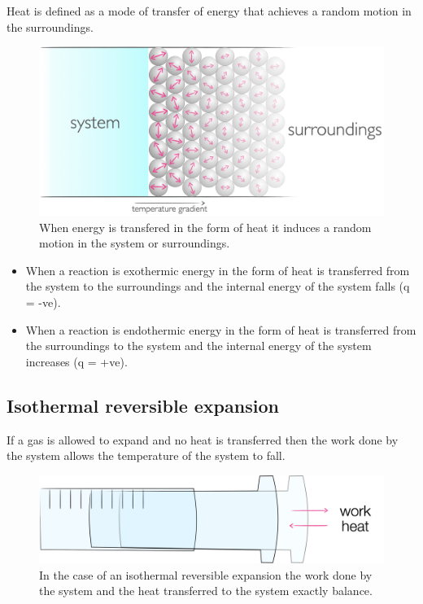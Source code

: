 \documentclass[
]{book}
\begin{document}
Heat is defined as a mode of transfer of energy that achieves a random motion in the surroundings.

\begin{figure}

{\centering \includegraphics[width=0.5\linewidth]{images/heat} 

}

\caption{When energy is transfered in the form of heat it induces a random motion in the system or surroundings.}\label{fig:heat}
\end{figure}

\begin{itemize}
\item
  When a reaction is exothermic energy in the form of heat is transferred from the system to the surroundings and the internal energy of the system falls (q = -ve).
\item
  When a reaction is endothermic energy in the form of heat is transferred from the surroundings to the system and the internal energy of the system increases (q = +ve).
\end{itemize}

\hypertarget{isothermal-reversible-expansion}{%
\subsection{Isothermal reversible expansion}\label{isothermal-reversible-expansion}}

If a gas is allowed to expand and no heat is transferred then the work done by the system allows the temperature of the system to fall.

\begin{figure}

{\centering \includegraphics[width=0.5\linewidth]{images/isothermalexpansion} 

}

\caption{In the case of an isothermal reversible expansion the work done by the system and the heat transferred to the system exactly balance.}\label{fig:isothermalexpansion}
\end{figure}
\end{document}
